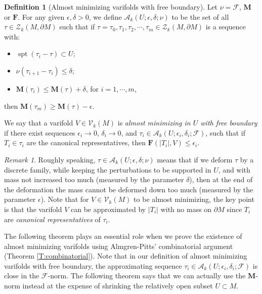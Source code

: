 \documentclass[10pt]{amsart}
\theoremstyle{definition}
\newtheorem{definition}[theorem]{Definition}
\theoremstyle{remark}
\newtheorem{remark}[theorem]{Remark}
\numberwithin{equation}{section}
\newcommand{\V}{\mathcal{V}}
\newcommand{\F}{\mathcal{F}}
\newcommand{\de}{\delta}
\newcommand{\ep}{\epsilon}
\newcommand{\Z}{\mathcal{Z}}
\newcommand{\M}{\mathbf{M}}
\newcommand{\mF}{\mathbf{F}}
\newcommand{\sA}{\mathscr{A}}
\newcommand{\spt}{\operatorname{spt}}
\begin{document}
\begin{definition}[Almost minimizing varifolds with free boundary]
\label{D:am-varifolds}
Let $\nu = \F$, $\M$ or $\mF$. For any given $\ep, \de>0$, we define $\sA_k(U; \ep, \de; \nu)$ to be the set of all $\tau\in\Z_k(M, \partial M)$ such that if $\tau=\tau_0, \tau_1, \tau_2, \cdots, \tau_m\in\Z_k(M, \partial M)$ is a sequence with:
\begin{itemize}
\item $\spt(\tau_i-\tau)\subset U$;
\item $\nu(\tau_{i+1}- \tau_i)\leq \de$;
\item $\M(\tau_i)\leq \M(\tau)+\de$, for $i=1, \cdots, m$,
\end{itemize}
then $\M(\tau_m)\geq \M(\tau)-\ep$.

We say that a varifold $V\in\V_k(M)$ is {\em almost minimizing in $U$ with free boundary} if there exist sequences $\ep_i \to 0$, $\de_i \to 0$, and $\tau_i\in \sA_k(U; \ep_i, \de_i; \F)$, such that if $T_i \in \tau_i$ are the canonical representatives, then $\mF(|T_i|, V)\leq \ep_i$.
\end{definition}

\begin{remark}
Roughly speaking, $\tau \in \sA_k(U;\ep,\de;\nu)$ means that if we deform $\tau$ by a discrete family, while keeping the perturbations to be supported in $U$, and with mass not increased too much (measured by the parameter $\de$), then at the end of the deformation the mass cannot be deformed down too much (measured by the parameter $\ep$).  Note that for $V \in \V_k(M)$ to be almost minimizing, the key point is that the varifold $V$ can be approximated by $|T_i|$ with no mass on $\partial M$ since $T_i$ are \emph{canonical representatives} of $\tau_i$.
\end{remark}


The following theorem plays an essential role when we prove the existence of almost minimizing varifolds using Almgren-Pitts' combinatorial argument (Theorem \ref{T:combinatorial}). Note that in our definition of almost minimizing varifolds with free boundary, the approximating sequence $\tau_i \in \sA_k(U; \ep_i, \de_i; \F)$ is close in the $\F$-norm. The following theorem says that we can actually use the $\M$-norm instead at the expense of shrinking the relatively open subset $U \subset M$.
\end{document}
